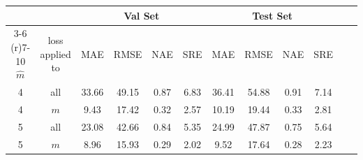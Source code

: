 \begin{tabular}{cccccccccccc} 
 \toprule
 & & \multicolumn{4}{c}{Val Set} & \multicolumn{4}{c}{Test Set} & \\
 \cmidrule(r){3-6} \cmidrule(r){7-10}
$\hat{m}$ & loss applied to &\multicolumn{1}{c}{MAE} & \multicolumn{1}{c}{RMSE} & \multicolumn{1}{c}{NAE} & \multicolumn{1}{c}{SRE} & \multicolumn{1}{c}{MAE} & \multicolumn{1}{c}{RMSE} & \multicolumn{1}{c}{NAE} & \multicolumn{1}{c}{SRE} \\ 
\midrule
4 & all & 33.66 & 49.15 & 0.87 & 6.83 & 36.41 & 54.88 & 0.91 & 7.14 \\
4 & $m$ & 9.43 & 17.42 & 0.32 & 2.57 & 10.19 & 19.44 & 0.33 & 2.81 \\
5 & all & 23.08 & 42.66 & 0.84 & 5.35 & 24.99 & 47.87 & 0.75 & 5.64 \\
5 & $m$ & 8.96 & 15.93 & 0.29 & 2.02 & 9.52 & 17.64 & 0.28 & 2.23 \\

 \bottomrule
\end{tabular}